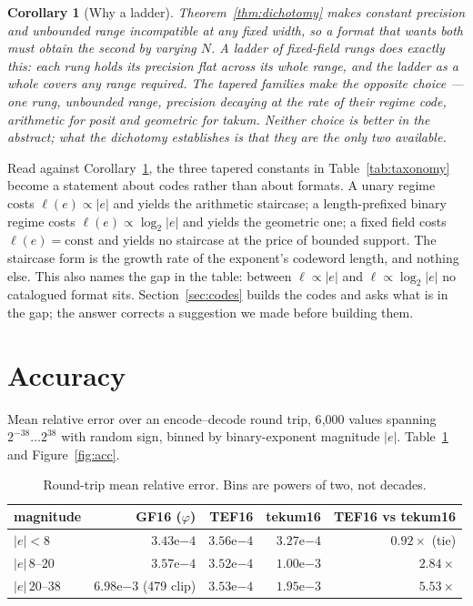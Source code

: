 \documentclass[11pt]{article}
\newtheorem{corollary}{Corollary}
\theoremstyle{definition}
\begin{document}
\begin{corollary}[Why a ladder]
\label{cor:ladder}
Theorem~\ref{thm:dichotomy} makes constant precision and unbounded range
incompatible at any fixed width, so a format that wants both must obtain the
second by varying $N$. A ladder of fixed-field rungs does exactly this: each rung
holds its precision flat across its whole range, and the ladder as a whole covers
any range required. The tapered families make the opposite choice --- one rung,
unbounded range, precision decaying at the rate of their regime code, arithmetic
for posit and geometric for takum. Neither choice is better in the abstract; what
the dichotomy establishes is that they are the only two available.
\end{corollary}

Read against Corollary~\ref{cor:ladder}, the three tapered constants in
Table~\ref{tab:taxonomy} become a statement about codes rather than about
formats. A unary regime costs $\ell(e) \propto |e|$ and yields the arithmetic
staircase; a length-prefixed binary regime costs $\ell(e) \propto \log_2 |e|$ and
yields the geometric one; a fixed field costs $\ell(e) = \mathrm{const}$ and
yields no staircase at the price of bounded support. The staircase form is the
growth rate of the exponent's codeword length, and nothing else. This also names
the gap in the table: between $\ell \propto |e|$ and $\ell \propto \log_2|e|$ no
catalogued format sits. Section~\ref{sec:codes} builds the codes and asks what is
in the gap; the answer corrects a suggestion we made before building them.

\section{Accuracy}\label{sec:accuracy}

Mean relative error over an encode--decode round trip, 6{,}000 values spanning
$2^{-38}\ldots2^{38}$ with random sign, binned by binary-exponent magnitude
$|e|$. Table~\ref{tab:acc} and Figure~\ref{fig:acc}.

\begin{table}[t]\centering
\caption{Round-trip mean relative error. Bins are powers of two, not decades.}
\label{tab:acc}
\begin{tabular}{lrrrr}
\toprule
magnitude & GF16 ($\varphi$) & \textbf{TEF16} & tekum16 & TEF16 vs tekum16 \\
\midrule
$|e|<8$        & $3.43\mathrm{e}{-4}$              & $3.56\mathrm{e}{-4}$ & $3.27\mathrm{e}{-4}$ & $0.92\times$ (tie) \\
$|e|\,8$--$20$   & $3.57\mathrm{e}{-4}$              & $3.52\mathrm{e}{-4}$ & $1.00\mathrm{e}{-3}$ & $\mathbf{2.84\times}$ \\
$|e|\,20$--$38$  & $6.98\mathrm{e}{-3}$ (479 clip)   & $3.53\mathrm{e}{-4}$ & $1.95\mathrm{e}{-3}$ & $\mathbf{5.53\times}$ \\
\bottomrule
\end{tabular}
\end{table}
\end{document}
